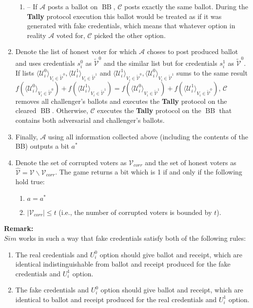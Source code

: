 \documentclass[12pt]{article}
\DeclareMathOperator{\bb}{BB}
\begin{document}
\begin{enumerate}
\begin{enumerate}
\item[] --  If  $\mathcal{A}$ posts a ballot on $\bb$, $\mathcal{C}$ posts exactly the same ballot. During the \textbf{Tally} protocol execution this ballot would be treated as if it was generated with fake credentials, which means that whatever option in reality $\mathcal{A}$ voted for, $\mathcal{C}$ picked the other option.  
\end{enumerate}
\item Denote the list of honest voter for which $\mathcal{A}$ choses to post produced ballot and uses credentials $s_i^0$  as $ \tilde{\mathcal{V}}^0$ and the similar list but for credentials $s_i^1$ as $ \tilde{\mathcal{V}}^0$.  If  lists $\langle \mathcal{U}^0_i \rangle _{V_i \in \tilde{\mathcal{V}}^0}, \langle \mathcal{U}^1_i \rangle _{V_i \in \tilde{\mathcal{V}}^1}$ and $\langle \mathcal{U}^1_i \rangle _{V_i \in \tilde{\mathcal{V}}^0}, \langle \mathcal{U}^0_i \rangle _{V_i \in \tilde{\mathcal{V}}^1}$ sums to the same result $f(\langle \mathcal{U}^0_i \rangle _{V_i \in \tilde{\mathcal{V}}^0} ) + f(\langle \mathcal{U}^1_i \rangle _{V_i \in \tilde{\mathcal{V}}^1} ) =  f(\langle \mathcal{U}^0_i \rangle _{V_i \in \tilde{\mathcal{V}}^1} ) +  f(\langle \mathcal{U}^1_i \rangle _{V_i \in \tilde{\mathcal{V}}^0} )$, $\mathcal{C}$ removes all challenger's ballots and executes the \textbf{Tally} protocol on the cleared $\bb$. Otherwise, $\mathcal{C}$ executes the \textbf{Tally} protocol on the $\bb$ that contains both adversarial and challenger's ballots. 
\item Finally, $\mathcal{A}$ using all information collected above (including the contents of the BB) outputs a bit $a^*$
\item Denote the set of corrupted voters as $\mathcal{V}_{corr}$ and the set of honest voters as $\hat{\mathcal{V}}= \mathcal{V} \backslash \mathcal{V}_{corr}$. The game returns a bit which is 1 if and only if the following hold true:
\begin{enumerate}
 \item $a = a^*$
 \item $|\mathcal{V}_{corr}| \leq t$ (i.e., the number of corrupted voters is bounded by $t$).
\end{enumerate} 
\end{enumerate}

\textbf{Remark:}\\
$Sim$ works in such a way that fake credentials satisfy both of the following rules: 
\begin{enumerate}
 \item The real credentials and $U_i^0$ option  should give ballot and receipt, which are identical indistinguishable from ballot and receipt produced for the fake credentials and  $U_i^1$ option.
 \item The fake credentials and $U_i^0$ option  should give ballot and receipt, which are identical to ballot and receipt produced for the real credentials and  $U_i^1$ option.
 \end{enumerate}
\end{document}
